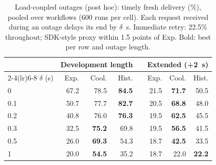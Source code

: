 \begin{table}[t]
\centering
\caption{Load-coupled outages (post hoc): timely fresh delivery (\%), pooled over workflows (600 runs per cell). Each request received during an outage delays its end by $\delta$~s. Immediate retry: 22.5\% throughout; SDK-style proxy within 1.5 points of Exp. Bold: best per row and outage length.}
\label{tab:load}
\scriptsize
\setlength{\tabcolsep}{4pt}
\begin{tabular}{@{}lrrrcrrr@{}}\toprule
 & \multicolumn{3}{c}{Development length} && \multicolumn{3}{c}{Extended (+2~s)}\\
\cmidrule(lr){2-4}\cmidrule(lr){6-8}
$\delta$ (s) & Exp. & Cool. & Hist. && Exp. & Cool. & Hist.\\\midrule
0 & 67.2 & 78.5 & \textbf{84.5} && 21.5 & \textbf{71.7} & 50.5\\
0.1 & 50.7 & 77.7 & \textbf{82.7} && 20.5 & \textbf{68.8} & 48.0\\
0.2 & 40.8 & 76.0 & \textbf{76.3} && 19.5 & \textbf{62.5} & 45.5\\
0.3 & 32.5 & \textbf{75.2} & 69.8 && 19.5 & \textbf{56.5} & 41.5\\
0.5 & 26.0 & \textbf{69.3} & 54.3 && 18.7 & \textbf{42.5} & 33.5\\
1 & 20.0 & \textbf{54.5} & 35.2 && 18.7 & 22.0 & \textbf{22.2}\\\bottomrule
\end{tabular}
\end{table}

